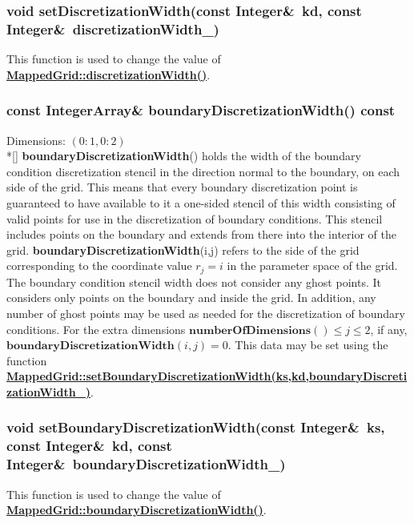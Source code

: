 \documentclass{article}
\begin{document}
  \subsubsection{void setDiscretizationWidth(const Integer\&~kd, const Integer\&~discretizationWidth\_)}
  \label{MappedGrid::setDiscretizationWidth(kd,discretizationWidth_)}
    This function is used to change the value of
    {\bf{}\hyperref{discretizationWidth()}{discretizationWidth() \rm(\S}{)}{MappedGrid::discretizationWidth()}}.

  \subsubsection{const IntegerArray\& boundaryDiscretizationWidth() const}
  \label{MappedGrid::boundaryDiscretizationWidth()}
    Dimensions: $(0\colon1,0\colon2)$ \\*[\parskip]
    \textbf{boundaryDiscretizationWidth}() holds the width of the boundary condition discretization stencil
    in the direction normal to the boundary, on each side of the grid.
    This means that every boundary discretization point is guaranteed to have available to it a one-sided
    stencil of this width consisting of valid points for use in the discretization of boundary conditions.
    This stencil includes points on the boundary and extends from there into the interior of the grid.
    \textbf{boundaryDiscretizationWidth}(i,j) refers to the side of the grid corresponding to
    the coordinate value $r_j = i$ in the parameter space of the grid.
    The boundary condition stencil width does not consider any ghost points.
    It considers only points on the boundary and inside the grid.
    In addition, any number of ghost points may be used as needed for the discretization of boundary conditions.
    For the extra dimensions $\textbf{numberOfDimensions}()\le j \le 2$, if any, $\textbf{boundaryDiscretizationWidth}(i,j)=0$.
    This data may be set using the function
    {\bf{}\hyperref{setBoundaryDiscretizationWidth(ks,kd,boundaryDiscretizationWidth\_)}{setBoundaryDiscretizationWidth(ks,kd,boundaryDiscretizationWidth\_) \rm(\S}{)}{MappedGrid::setBoundaryDiscretizationWidth(ks,kd,boundaryDiscretizationWidth_)}}.

  \subsubsection{void setBoundaryDiscretizationWidth(const Integer\&~ks, const Integer\&~kd, const Integer\&~boundaryDiscretizationWidth\_)}
  \label{MappedGrid::setBoundaryDiscretizationWidth(ks,kd,boundaryDiscretizationWidth_)}
    This function is used to change the value of
    {\bf{}\hyperref{boundaryDiscretizationWidth()}{boundaryDiscretizationWidth() \rm(\S}{)}{MappedGrid::boundaryDiscretizationWidth()}}.
\end{document}
